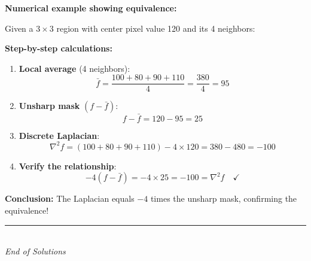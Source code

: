 \documentclass[12pt,a4paper]{article}
\begin{document}
\begin{example}
\textbf{Numerical example showing equivalence:}

Given a $3 \times 3$ region with center pixel value 120 and its 4 neighbors:

\begin{center}
\end{center}

\textbf{Step-by-step calculations:}

\begin{enumerate}
    \item \textbf{Local average} (4 neighbors):
    \[
    \bar{f} = \frac{100 + 80 + 90 + 110}{4} = \frac{380}{4} = 95
    \]

    \item \textbf{Unsharp mask} $(f - \bar{f})$:
    \[
    f - \bar{f} = 120 - 95 = 25
    \]

    \item \textbf{Discrete Laplacian}:
    \[
    \nabla^2 f = (100 + 80 + 90 + 110) - 4 \times 120 = 380 - 480 = -100
    \]

    \item \textbf{Verify the relationship}:
    \[
    -4(f - \bar{f}) = -4 \times 25 = -100 = \nabla^2 f \quad \checkmark
    \]
\end{enumerate}

\textbf{Conclusion:} The Laplacian equals $-4$ times the unsharp mask, confirming the equivalence!
\end{example}

\vfill
\begin{center}
\rule{0.5\textwidth}{0.4pt}\\[1em]
\textit{End of Solutions}
\end{center}
\end{document}
